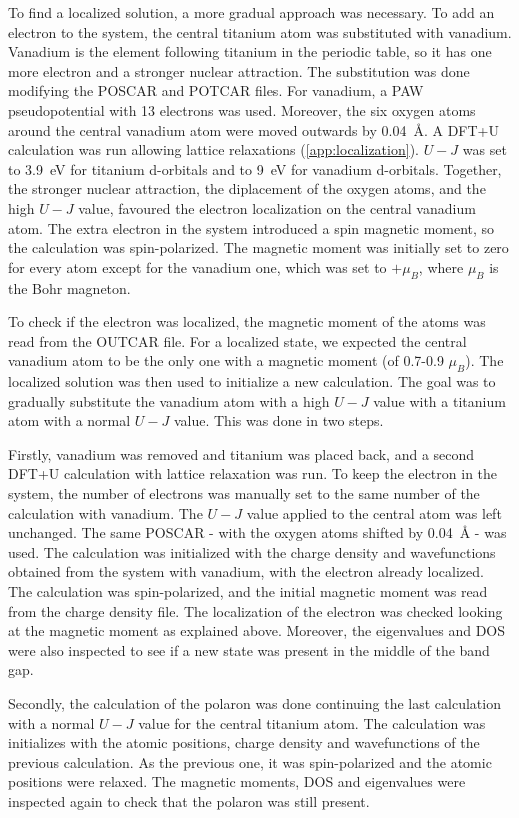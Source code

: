 To find a localized solution, a more gradual approach was necessary. To add an electron to the system, the central titanium atom was substituted with vanadium. Vanadium is the element following titanium in the periodic table, so it has one more electron and a stronger nuclear attraction. The substitution was done modifying the POSCAR and POTCAR files. For vanadium, a PAW pseudopotential with 13 electrons was used. Moreover, the six oxygen atoms around the central vanadium atom were moved outwards by \SI{0.04}{\angstrom}. A DFT+U calculation was run allowing lattice relaxations (\cref{app:localization}). $U-J$ was set to \SI{3.9}{eV} for titanium d-orbitals and to \SI{9}{eV} for vanadium d-orbitals. Together, the stronger nuclear attraction, the diplacement of the oxygen atoms, and the high $U-J$ value, favoured the electron localization on the central vanadium atom. The extra electron in the system introduced a spin magnetic moment, so the calculation was spin-polarized. The magnetic moment was initially set to zero for every atom except for the vanadium one, which was set to $+\mu_B$, where $\mu_B$ is the Bohr magneton.

To check if the electron was localized, the magnetic moment of the atoms was read from the OUTCAR file. For a localized state, we expected the central vanadium atom to be the only one with a magnetic moment (of 0.7-0.9 $\mu_B$). The localized solution was then used to initialize a new calculation. The goal was to gradually substitute the vanadium atom with a high $U-J$ value with a titanium atom with a normal $U-J$ value. This was done in two steps.

Firstly, vanadium was removed and titanium was placed back, and a second DFT+U calculation with lattice relaxation was run. To keep the electron in the system, the number of electrons was manually set to the same number of the calculation with vanadium. The $U-J$ value applied to the central atom was left unchanged. The same POSCAR - with the oxygen atoms shifted by \SI{0.04}{\angstrom} - was used. The calculation was initialized with the charge density and wavefunctions obtained from the system with vanadium, with the electron already localized. The calculation was spin-polarized, and the initial magnetic moment was read from the charge density file. The localization of the electron was checked looking at the magnetic moment as explained above. Moreover, the eigenvalues and DOS were also inspected to see if a new state was present in the middle of the band gap.

Secondly, the calculation of the polaron was done continuing the last calculation with a normal $U-J$ value for the central titanium atom. The calculation was initializes with the atomic positions, charge density and wavefunctions of the previous calculation. As the previous one, it was spin-polarized and the atomic positions were relaxed. The magnetic moments, DOS and eigenvalues were inspected again to check that the polaron was still present.

